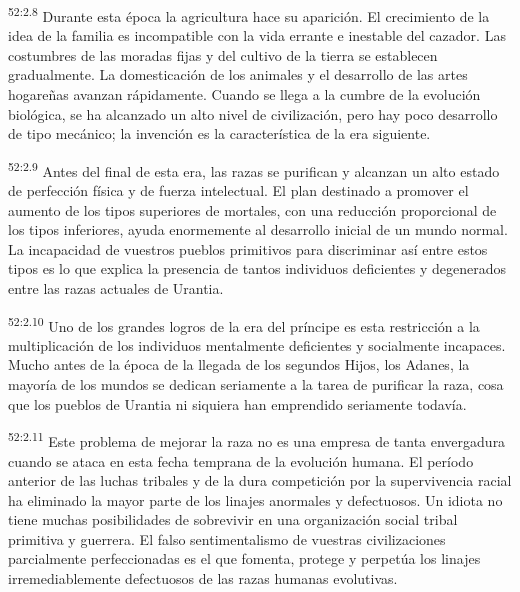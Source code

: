 \par
\textsuperscript{52:2.8} Durante esta época la agricultura hace su aparición. El crecimiento de la idea de la familia es incompatible con la vida errante e inestable del cazador. Las costumbres de las moradas fijas y del cultivo de la tierra se establecen gradualmente. La domesticación de los animales y el desarrollo de las artes hogareñas avanzan rápidamente. Cuando se llega a la cumbre de la evolución biológica, se ha alcanzado un alto nivel de civilización, pero hay poco desarrollo de tipo mecánico; la invención es la característica de la era siguiente.

\par
\textsuperscript{52:2.9} Antes del final de esta era, las razas se purifican y alcanzan un alto estado de perfección física y de fuerza intelectual. El plan destinado a promover el aumento de los tipos superiores de mortales, con una reducción proporcional de los tipos inferiores, ayuda enormemente al desarrollo inicial de un mundo normal. La incapacidad de vuestros pueblos primitivos para discriminar así entre estos tipos es lo que explica la presencia de tantos individuos deficientes y degenerados entre las razas actuales de Urantia.

\par
\textsuperscript{52:2.10} Uno de los grandes logros de la era del príncipe es esta restricción a la multiplicación de los individuos mentalmente deficientes y socialmente incapaces. Mucho antes de la época de la llegada de los segundos Hijos, los Adanes, la mayoría de los mundos se dedican seriamente a la tarea de purificar la raza, cosa que los pueblos de Urantia ni siquiera han emprendido seriamente todavía.

\par
\textsuperscript{52:2.11} Este problema de mejorar la raza no es una empresa de tanta envergadura cuando se ataca en esta fecha temprana de la evolución humana. El período anterior de las luchas tribales y de la dura competición por la supervivencia racial ha eliminado la mayor parte de los linajes anormales y defectuosos. Un idiota no tiene muchas posibilidades de sobrevivir en una organización social tribal primitiva y guerrera. El falso sentimentalismo de vuestras civilizaciones parcialmente perfeccionadas es el que fomenta, protege y perpetúa los linajes irremediablemente defectuosos de las razas humanas evolutivas.


